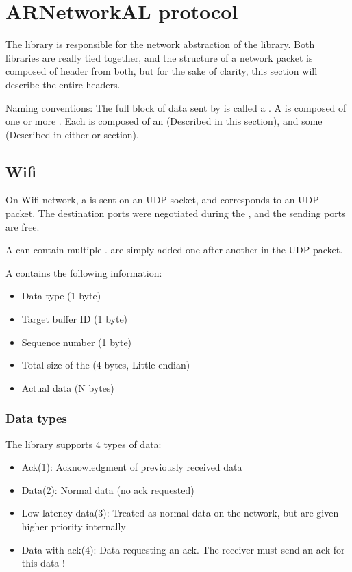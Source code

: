 \section{ARNetworkAL protocol}

The  library is responsible for the network abstraction of the  library. Both libraries are really tied together, and the structure of a network packet is composed of header from both, but for the sake of clarity, this section will describe the entire  headers.

Naming conventions: The full block of data sent by  is called a . A  is composed of one or more . Each  is composed of an  (Described in this section), and some  (Described in either  or  section).

\subsection{Wifi}

On Wifi network, a  is sent on an UDP socket, and corresponds to an UDP packet. The destination ports were negotiated during the , and the sending ports are free.


A  can contain multiple .  are simply added one after another in the UDP packet.


A  contains the following information:
\begin{itemize}
\item{Data type (1 byte)}
\item{Target buffer ID (1 byte)}
\item{Sequence number (1 byte)}
\item{Total size of the  (4 bytes, Little endian)}
\item{Actual data (N bytes)}
\end{itemize}

\subsubsection{Data types}

The  library supports 4 types of data:
\begin{itemize}
\item{Ack(1): Acknowledgment of previously received data} 
\item{Data(2): Normal data (no ack requested)}
\item{Low latency data(3): Treated as normal data on the network, but are given higher priority internally}
\item{Data with ack(4): Data requesting an ack. The receiver must send an ack for this data !}
\end{itemize}

